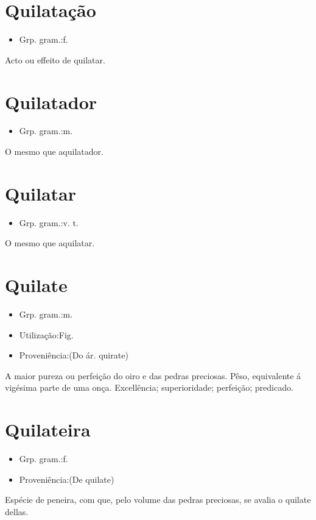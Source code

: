 \section{Quilatação}
\begin{itemize}
\item {Grp. gram.:f.}
\end{itemize}
Acto ou effeito de quilatar.
\section{Quilatador}
\begin{itemize}
\item {Grp. gram.:m.}
\end{itemize}
O mesmo que \textunderscore aquilatador\textunderscore .
\section{Quilatar}
\begin{itemize}
\item {Grp. gram.:v. t.}
\end{itemize}
O mesmo que \textunderscore aquilatar\textunderscore .
\section{Quilate}
\begin{itemize}
\item {Grp. gram.:m.}
\end{itemize}
\begin{itemize}
\item {Utilização:Fig.}
\end{itemize}
\begin{itemize}
\item {Proveniência:(Do ár. \textunderscore quirate\textunderscore )}
\end{itemize}
A maior pureza ou perfeição do oiro e das pedras preciosas.
Pêso, equivalente á vigésima parte de uma onça.
Excellência; superioridade; perfeição; predicado.
\section{Quilateira}
\begin{itemize}
\item {Grp. gram.:f.}
\end{itemize}
\begin{itemize}
\item {Proveniência:(De \textunderscore quilate\textunderscore )}
\end{itemize}
Espécie de peneira, com que, pelo volume das pedras preciosas, se avalia o quilate dellas.
